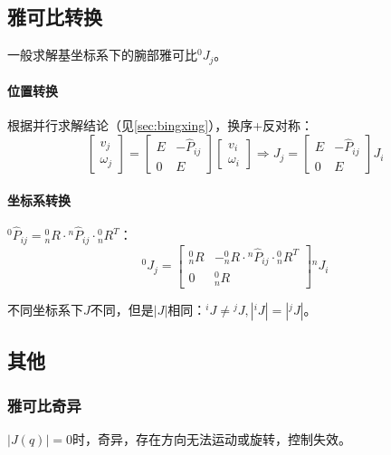 \documentclass[
12pt, %
a4paper, 
oneside, %
headinclude,footinclude, %
]{scrartcl}
\begin{document}
\subsection[雅可比转换]{雅可比转换}\label{sec:Jacobian transform}\label{sec:bingxing_back1}
一般求解基坐标系下的腕部雅可比$ ^0 J_j $。
\paragraph{位置转换}
根据并行求解结论（见\ref{sec:bingxing}），换序+反对称：
$$ \begin{bmatrix} v_j \\ \omega_j \end{bmatrix} = \begin{bmatrix} E & -\hat{P}_{ij} \\ 0 & E \end{bmatrix} \begin{bmatrix} v_i \\ \omega_i \end{bmatrix} \Rightarrow J_j = \begin{bmatrix} E & -\hat{P}_{ij} \\ 0 & E \end{bmatrix} J_i $$ 
\paragraph{坐标系转换}
$ {}^0 \hat{P}_{ij} = {}^0_n R \cdot {}^n \hat{P}_{ij} \cdot {}^0_n R^T $：
$$ {}^0 J_j = \begin{bmatrix} {}^0_n R & -{}^0_n R \cdot {}^n \hat{P}_{ij} \cdot {}^0_n R^T \\ 0 & {}^0_n R \end{bmatrix} {}^n J_i $$

不同坐标系下$ J $不同，但是$ |J| $相同：$ {}^i J \neq {}^j J, |{}^i J| = |{}^j J| $。
\subsection[其他]{其他}
\subsubsection[雅可比奇异]{雅可比奇异}
$ |J(q)| = 0 $时，奇异，存在方向无法运动或旋转，控制失效。
\end{document}
